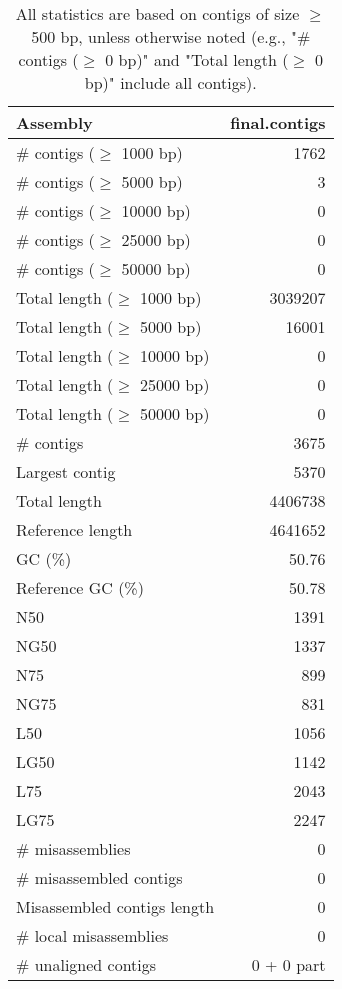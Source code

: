\documentclass[12pt,a4paper]{article}
\begin{document}
\begin{table}[ht]
\begin{center}
\caption{All statistics are based on contigs of size $\geq$ 500 bp, unless otherwise noted (e.g., "\# contigs ($\geq$ 0 bp)" and "Total length ($\geq$ 0 bp)" include all contigs).}
\begin{tabular}{|l*{1}{|r}|}
\hline
Assembly & final.contigs \\ \hline
\# contigs ($\geq$ 1000 bp) & 1762 \\ \hline
\# contigs ($\geq$ 5000 bp) & 3 \\ \hline
\# contigs ($\geq$ 10000 bp) & 0 \\ \hline
\# contigs ($\geq$ 25000 bp) & 0 \\ \hline
\# contigs ($\geq$ 50000 bp) & 0 \\ \hline
Total length ($\geq$ 1000 bp) & 3039207 \\ \hline
Total length ($\geq$ 5000 bp) & 16001 \\ \hline
Total length ($\geq$ 10000 bp) & 0 \\ \hline
Total length ($\geq$ 25000 bp) & 0 \\ \hline
Total length ($\geq$ 50000 bp) & 0 \\ \hline
\# contigs & 3675 \\ \hline
Largest contig & 5370 \\ \hline
Total length & 4406738 \\ \hline
Reference length & 4641652 \\ \hline
GC (\%) & 50.76 \\ \hline
Reference GC (\%) & 50.78 \\ \hline
N50 & 1391 \\ \hline
NG50 & 1337 \\ \hline
N75 & 899 \\ \hline
NG75 & 831 \\ \hline
L50 & 1056 \\ \hline
LG50 & 1142 \\ \hline
L75 & 2043 \\ \hline
LG75 & 2247 \\ \hline
\# misassemblies & 0 \\ \hline
\# misassembled contigs & 0 \\ \hline
Misassembled contigs length & 0 \\ \hline
\# local misassemblies & 0 \\ \hline
\# unaligned contigs & 0 + 0 part \\ \hline

\end{tabular}
\end{center}
\end{table}
\end{document}
